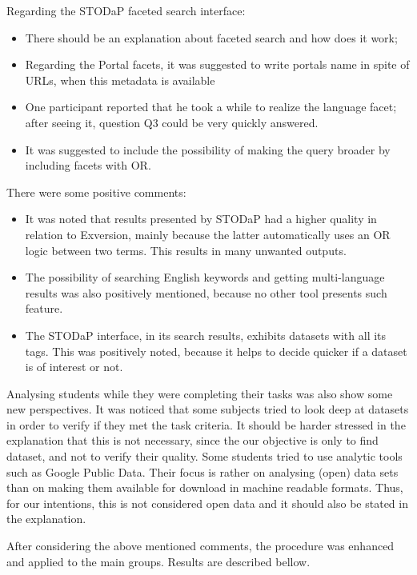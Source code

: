 Regarding the STODaP faceted search interface:
\begin{itemize}
	\item There should be an explanation about faceted search and how does it work;
	\item Regarding the Portal facets, it was suggested to write portals name in spite of URLs, when this metadata is available
	\item One participant reported that he took a while to realize the language facet; after seeing it, question Q3 could be very quickly answered.
	\item It was suggested to include the possibility of making the query broader by including facets with OR.
\end{itemize}	

There were some positive comments:
\begin{itemize}
	\item It was noted that results presented by STODaP had a higher quality in relation to Exversion, mainly because the latter automatically uses an OR logic between two terms.
	This results in many unwanted outputs.
	\item The possibility of searching English keywords and getting multi-language results was also positively mentioned, because no other tool presents such feature.
	\item The STODaP interface, in its search results, exhibits datasets with all its tags.
	This was positively noted, because it helps to decide quicker if a dataset is of interest or not.
\end{itemize}	

Analysing students while they were completing their tasks was also show some new perspectives.
It was noticed that some subjects tried to look deep at datasets in order to verify if they met the task criteria.
It should be harder stressed in the explanation that this is not necessary, since the our objective is only to find dataset, and not to verify their quality.
Some students tried to use analytic tools such as Google Public Data.
Their focus is rather on analysing (open) data sets than on making them available for download in machine readable formats.
Thus, for our intentions, this is not considered open data and it should also be stated in the explanation.

After considering the above mentioned comments, the procedure was enhanced and applied to the main groups.
Results are described bellow.


